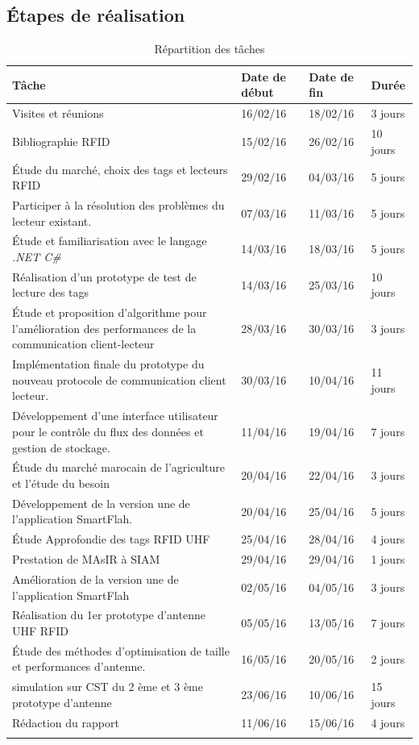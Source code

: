 \documentclass[11pt, a4paper, twoside]{book}
\begin{document}
\subsection{Étapes	de réalisation}
\begin{longtable}{|p{}|p{}|p{}| p{}|}
\hline
\textbf{Tâche} & \textbf{Date de début} & \textbf{Date de fin} & \textbf{Durée} \\
\hline
Visites et réunions & 16/02/16 & 18/02/16 & 3 jours \\
\hline
Bibliographie RFID & 15/02/16 & 26/02/16 & 10 jours \\
\hline
Étude du marché, choix des tags et lecteurs RFID & 29/02/16 & 04/03/16 & 5 jours \\
\hline
Participer à la résolution des problèmes du lecteur existant.
 & 07/03/16 & 11/03/16 & 5 jours \\
\hline
Étude et familiarisation avec le langage \emph{.NET C\#} & 14/03/16 & 18/03/16 & 5 jours \\
\hline
Réalisation d'un prototype de test de lecture des tags & 14/03/16 & 25/03/16 & 10 jours \\
\hline
 Étude et proposition d'algorithme pour l'amélioration des performances de la communication client-lecteur
 & 28/03/16 & 30/03/16 & 3 jours \\
\hline
Implémentation finale du prototype du nouveau protocole de communication client lecteur.
 & 30/03/16 & 10/04/16 & 11 jours \\
\hline
Développement d'une interface utilisateur pour le contrôle du flux des données et gestion de stockage.
 & 11/04/16 & 19/04/16 & 7 jours \\
\hline
Étude du marché marocain de l'agriculture et l'étude du besoin & 20/04/16 & 22/04/16 & 3 jours \\
\hline
Développement de la version une de l'application SmartFlah. & 20/04/16 & 25/04/16 & 5 jours \\
\hline
Étude Approfondie des tags RFID UHF  & 25/04/16 & 28/04/16 & 4 jours \\
\hline
Prestation de MAsIR à SIAM  & 29/04/16 & 29/04/16 & 1 jours \\
\hline
Amélioration de la version une de l'application SmartFlah & 02/05/16 & 04/05/16 & 3 jours \\
\hline
Réalisation du 1er prototype d'antenne UHF RFID & 05/05/16 & 13/05/16 & 7 jours \\
\hline
Étude des méthodes d'optimisation de taille et performances d'antenne. & 16/05/16 & 20/05/16 & 2 jours \\
\hline
simulation sur CST du 2 ème et 3 ème prototype d'antenne & 23/06/16 & 10/06/16 & 15 jours \\
\hline
Rédaction du rapport & 11/06/16 & 15/06/16 & 4 jours \\
\hline
\caption{Répartition des tâches}
\end{longtable}
\end{document}
